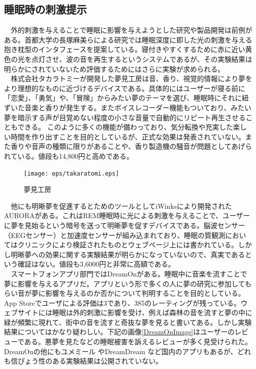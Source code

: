 \subsection{睡眠時の刺激提示}
　外的刺激を与えることで睡眠に影響を与えようとした研究や製品開発は前例がある。首都大学の長塚麻美らによる研究では睡眠深度に即した光の刺激を与える抱き枕型のインタフェースを提案している\cite{sleepSheep}。寝付きやすくするために赤に近い黄色の光を点灯させ、波の音を再生するというシステムであるが、その実験結果は明らかにされていないため評価するためにはさらに実験が求められる。\\
　株式会社タカラトミーが開発した夢見工房は音、香り、視覚的情報により夢をより理想的なものに近づけるデバイスである。具体的にはユーザーが寝る前に「恋愛」、「勇気」や、「冒険」からみたい夢のテーマを選び、睡眠時にそれに紐ずいた音楽と香りが発生する。またボイスレコーダー機能もついており、みたい夢を暗示する声が目覚めない程度の小さな音量で自動的にリピート再生させることもできる。 \cite{takaratomi}このように多くの機能が備わっており、気分転換や充実した楽しい時間を作り出すことを目的としているが、正式な効果は発表されていない。また香りや音声の種類に限りがあることや、香り製造機の騒音が問題としてあげられている。値段も14,800円と高めである。
\begin{figure}[htbp]
\begin{center}
\texttt{[image: eps/takaratomi.eps]}
\caption{夢見工房}
\label{takaratomi}
\end{center}
\end{figure}

　他にも明晰夢を促進するとためのツールとしてiWinksにより開発されたAURORAがある。\cite{iWinks}これはREM睡眠時に光による刺激を与えることで、ユーザーに夢を見始るという暗号を送って明晰夢を促すデバイスである。脳波センサー（EEGセンサー）と加速度センサーが組み込まれており、睡眠の質観測においてはクリニックにより検証されたものとウェブページ上には書かれている。しかし明晰夢への効果に関する実験結果が明らかになっていないので、真実であるという確証はない。値段も3,6000円と非常に高額である。\\
　スマートフォンアプリ部門ではDreamOnがある。睡眠中に音楽を流すことで夢に影響を与えるアプリだ。アプリという形で多くの人に夢の研究に参加してもらい音が夢に影響を与えるのか否かについて判明することを目的としている。 \cite{dreamOn}App Storeでユーザによる評価は3であり、385のレーティングが残っている。ウェブサイトには睡眠は外的刺激に影響を受け、例えば森林の音を流すと夢の中に緑が頻繁に現れて、街中の音を流すと奇抜な夢を見ると書いてある。しかし実験結果についてはかなり疑わしい。下記の画像\ref{DreamOnImage}はユーザーのレビューである。悪夢を見たなどの睡眠被害を訴えるレビューが多く見受けられた。DreamOnの他にもユメミール \cite{yumemiru}やDreamDream \cite{DreamDream}など国内のアプリもあるが、どれも信ぴょう性のある実験結果は公開されていない。


